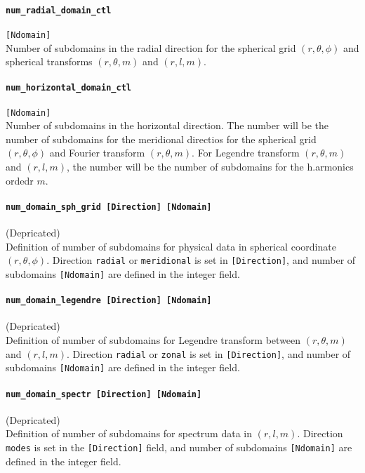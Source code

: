 \paragraph{\tt num\_radial\_domain\_ctl}
\label{href_t:num_radial_domain_ctl}
\verb|[Ndomain]| \\
Number of subdomains in the radial direction for the spherical grid $(r, \theta, \phi)$ and spherical transforms $(r, \theta, m)$ and $(r, l, m)$.

\paragraph{\tt num\_horizontal\_domain\_ctl}
\label{href_t:num_horizontal_domain_ctl} 
\verb|[Ndomain]| \\
Number of subdomains in the horizontal direction. The number will be the number of subdomains for the meridional directios for the spherical grid $(r, \theta, \phi)$ and Fourier transform $(r, \theta, m)$. For Legendre transform $(r, \theta, m)$ and $(r, l, m)$, the number will be the number of subdomains for the h.armonics ordedr $m$.


\paragraph{\color{magenta} \tt num\_domain\_sph\_grid    [Direction]    [Ndomain]}
\label{href_t:num_domain_sph_grid} 
{\color{magenta} (Depricated)}\\
 Definition of number of subdomains for physical data in spherical coordinate $(r, \theta, \phi)$. Direction {\tt  radial} or {\tt meridional} is set in \verb|[Direction]|, and number of subdomains \verb|[Ndomain]| are defined in the integer field.

\paragraph{\color{magenta} \tt num\_domain\_legendre    [Direction]    [Ndomain]}
\label{href_t:num_domain_legendre}
{\color{magenta} (Depricated)}\\
 Definition of number of subdomains for Legendre transform between $(r, \theta, m)$ and $(r, l, m)$. Direction {\tt  radial} or {\tt zonal} is set in \verb|[Direction]|, and number of subdomains \verb|[Ndomain]| are defined in the integer field.

\paragraph{\color{magenta} \tt num\_domain\_spectr    [Direction]    [Ndomain]}
\label{href_t:num_domain_spectr}
{\color{magenta} (Depricated)}\\
Definition of number of subdomains for spectrum data in $(r, l, m)$. Direction {\tt  modes} is set in the \verb|[Direction]| field, and number of subdomains \verb|[Ndomain]| are defined in the integer field.


